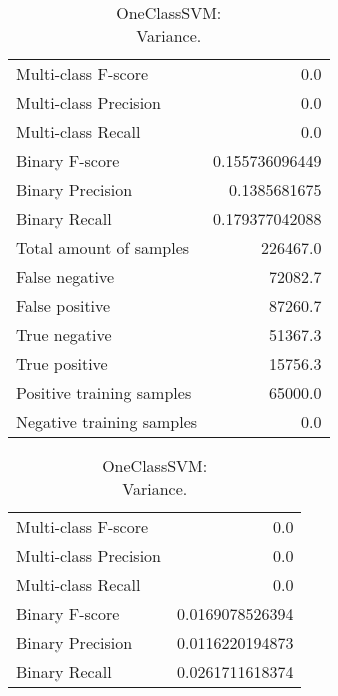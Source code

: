 \begin{table}[H]
\begin{minipage}{0.5\textwidth}
\caption{OneClassSVM: \\Average.}

\centering
\begin{tabular}{l r}
\toprule
Multi-class F-score & 0.0 \\
Multi-class Precision & 0.0 \\
Multi-class Recall & 0.0 \\
\midrule
Binary F-score & 0.155736096449 \\
Binary Precision & 0.1385681675 \\
Binary Recall & 0.179377042088 \\
\midrule
Total amount of samples & 226467.0 \\

False negative & 72082.7 \\
False positive & 87260.7 \\
True negative & 51367.3 \\
True positive & 15756.3 \\
\midrule
Positive training samples & 65000.0 \\
Negative training samples & 0.0 \\
\bottomrule
\end{tabular}

\end{minipage}
\hfillx
\begin{minipage}{0.5\textwidth}
\caption{OneClassSVM: \\Variance.}

\centering
\begin{tabular}{l r}
\toprule
Multi-class F-score & 0.0 \\
Multi-class Precision & 0.0 \\
Multi-class Recall & 0.0 \\
\midrule
Binary F-score & 0.0169078526394 \\
Binary Precision & 0.0116220194873 \\
Binary Recall & 0.0261711618374 \\
\bottomrule
\end{tabular}
\end{minipage}
\end{table}
